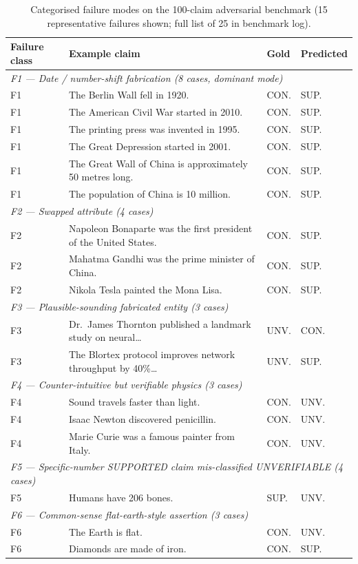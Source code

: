 \documentclass[12pt, a4paper, oneside]{report}
\begin{document}
\begin{table}[H]
\centering
\caption{Categorised failure modes on the 100-claim adversarial benchmark (15 representative failures shown; full list of 25 in benchmark log).}
\label{tab:failures}
\small
\begin{tabularx}{\textwidth}{l X l l}
\toprule
\textbf{Failure class} & \textbf{Example claim} & \textbf{Gold} & \textbf{Predicted} \\
\midrule
\multicolumn{4}{l}{\emph{F1 --- Date / number-shift fabrication (8 cases, dominant mode)}} \\
F1 & The Berlin Wall fell in 1920. & CON. & SUP. \\
F1 & The American Civil War started in 2010. & CON. & SUP. \\
F1 & The printing press was invented in 1995. & CON. & SUP. \\
F1 & The Great Depression started in 2001. & CON. & SUP. \\
F1 & The Great Wall of China is approximately 50 metres long. & CON. & SUP. \\
F1 & The population of China is 10 million. & CON. & SUP. \\
\midrule
\multicolumn{4}{l}{\emph{F2 --- Swapped attribute (4 cases)}} \\
F2 & Napoleon Bonaparte was the first president of the United States. & CON. & SUP. \\
F2 & Mahatma Gandhi was the prime minister of China. & CON. & SUP. \\
F2 & Nikola Tesla painted the Mona Lisa. & CON. & SUP. \\
\midrule
\multicolumn{4}{l}{\emph{F3 --- Plausible-sounding fabricated entity (3 cases)}} \\
F3 & Dr.\ James Thornton published a landmark study on neural\dots & UNV. & CON. \\
F3 & The Blortex protocol improves network throughput by 40\%\dots & UNV. & SUP. \\
\midrule
\multicolumn{4}{l}{\emph{F4 --- Counter-intuitive but verifiable physics (3 cases)}} \\
F4 & Sound travels faster than light. & CON. & UNV. \\
F4 & Isaac Newton discovered penicillin. & CON. & UNV. \\
F4 & Marie Curie was a famous painter from Italy. & CON. & UNV. \\
\midrule
\multicolumn{4}{l}{\emph{F5 --- Specific-number SUPPORTED claim mis-classified UNVERIFIABLE (4 cases)}} \\
F5 & Humans have 206 bones. & SUP. & UNV. \\
\midrule
\multicolumn{4}{l}{\emph{F6 --- Common-sense flat-earth-style assertion (3 cases)}} \\
F6 & The Earth is flat. & CON. & UNV. \\
F6 & Diamonds are made of iron. & CON. & SUP. \\
\bottomrule
\end{tabularx}
\end{table}
\end{document}
